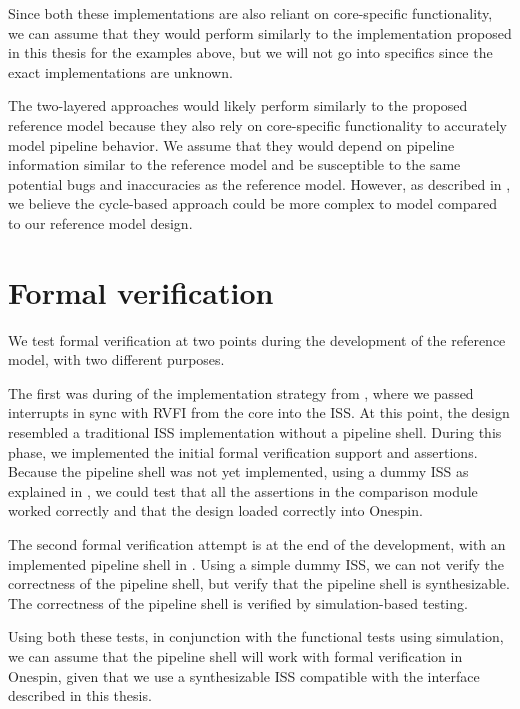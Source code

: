 Since both these implementations are also reliant on core-specific functionality, we can assume that they would perform similarly to the implementation proposed in this thesis for the examples above, but we will not go into specifics since the exact implementations are unknown.

The two-layered approaches would likely perform similarly to the proposed reference model because they also rely on core-specific functionality to accurately model pipeline behavior. We assume that they would depend on pipeline information similar to the reference model and be susceptible to the same potential bugs and inaccuracies as the reference model. However, as described in , we believe the cycle-based approach could be more complex to model compared to our reference model design.





\section{Formal verification}
\label{sec:res_formal}

We test formal verification at two points during the development of the reference model, with two different purposes.

The first was during  of the implementation strategy from , where we passed interrupts in sync with RVFI from the core into the ISS. At this point, the design resembled a traditional ISS implementation without a pipeline shell. During this phase, we implemented the initial formal verification support and assertions. Because the pipeline shell was not yet implemented, using a dummy ISS as explained in , we could test that all the assertions in the comparison module worked correctly and that the design loaded correctly into Onespin. 

The second formal verification attempt is at the end of the development, with an implemented pipeline shell in .  Using a simple dummy ISS, we can not verify the correctness of the pipeline shell, but verify that the pipeline shell is synthesizable. The correctness of the pipeline shell is verified by simulation-based testing.

Using both these tests, in conjunction with the functional tests using simulation, we can assume that the pipeline shell will work with formal verification in Onespin, given that we use a synthesizable ISS compatible with the interface described in this thesis.